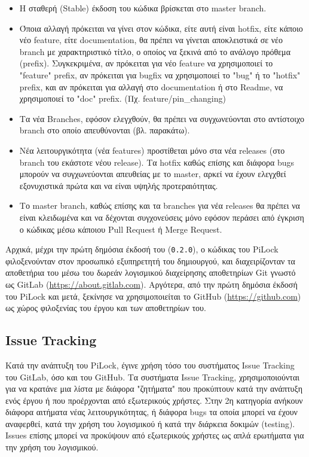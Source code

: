 		\begin{itemize}
			\item Η σταθερή (Stable) έκδοση του κώδικα βρίσκεται στο master branch.
			\item Όποια αλλαγή πρόκειται να γίνει στον κώδικα, είτε αυτή είναι hotfix, είτε κάποιο νέο feature, είτε documentation, θα πρέπει να γίνεται αποκλειστικά σε νέο branch με χαρακτηριστικό τίτλο, ο οποίος να ξεκινά από το ανάλογο πρόθεμα (prefix). Συγκεκριμένα, αν πρόκειται για νέο feature να χρησιμοποιεί το "feature" prefix, αν πρόκειται για bugfix να χρησιμοποιεί το "bug" ή το "hotfix" prefix, και αν πρόκειται για αλλαγή στο documentation ή στο Readme, να χρησιμοποιεί το "doc" prefix. (Πχ. feature/pin\_changing)
			\item Τα νέα Branches, εφόσον ελεγχθούν, θα πρέπει να συγχωνεύονται στο αντίστοιχο branch στο οποίο απευθύνονται (βλ. παρακάτω).
			\item Νέα λειτουργικότητα (νέα features) προστίθεται μόνο στα νέα releases (στο branch του εκάστοτε νέου release). Τα hotfix καθώς επίσης και διάφορα bugs μπορούν να συγχωνεύονται απευθείας με το master, αρκεί να έχουν ελεγχθεί εξονυχιστικά πρώτα και να είναι υψηλής προτεραιότητας.
			\item Το master branch, καθώς επίσης και τα branches για νέα releases θα πρέπει να είναι κλειδωμένα και να δέχονται συγχονεύσεις μόνο εφόσον περάσει από έγκριση ο κώδικας μέσω κάποιου Pull Request ή Merge Request.
		\end{itemize} 

		Αρχικά, μέχρι την πρώτη δημόσια έκδοσή του (\verb|0.2.0|), ο κώδικας του PiLock φιλοξενούνταν στον προσωπικό εξυπηρετητή του δημιουργού, και διαχειρίζονταν τα αποθετήρια του μέσω του δωρεάν λογισμικού διαχείρησης αποθετηρίων Git γνωστό ως GitLab (\url{https://about.gitlab.com}). Αργότερα, από την πρώτη δημόσια έκδοσή του PiLock και μετά, ξεκίνησε να χρησιμοποιείται το GitHub (\url{https://github.com}) ως χώρος φιλοξενίας του έργου και των αποθετηρίων του.

	\subsection{Issue Tracking}
		Κατά την ανάπτυξη του PiLock, έγινε χρήση τόσο του συστήματος Issue Tracking του GitLab, όσο και του GitHub. Τα συστήματα Issue Tracking, χρησιμοποιούνται για να κρατάνε μια λίστα με διάφορα "ζητήματα" που προκύπτουν κατά την ανάπτυξη ενός έργου ή που προέρχονται από εξωτερικούς χρήστες. Στην 2η κατηγορία ανήκουν διάφορα αιτήματα νέας λειτουργικότητας, ή διάφορα bugs τα οποία μπορεί να έχουν αναφερθεί, κατά την χρήση του λογισμικού ή κατά την διάρκεια δοκιμών (testing). Issues επίσης μπορεί να προκύψουν από εξωτερικούς χρήστες ως απλά ερωτήματα για την χρήση του λογισμικού.

